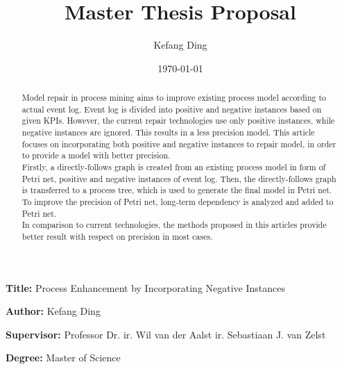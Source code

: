 \documentclass[]{article}
\title{Master Thesis Proposal}
\author{Kefang Ding}
\date{\today}
\newcommand{\namelistlabel}[1]{\mbox{#1}\hfil}
\newenvironment{namelist}[1]{%
	\begin{list}{}
		{
			\let\makelabel\namelistlabel
			\settowidth{\labelwidth}{#1}
			\setlength{\leftmargin}{1.1\labelwidth}
		}
	}{%
\end{list}}
\begin{document}
	\maketitle
	\hrulefill
	\begin{namelist}{xxxxxxxxxxxx}
		\item[{\bf Title:}]
		Process Enhancement by Incorporating Negative Instances
		\item[{\bf Author:}]
		Kefang Ding
		\item[{\bf Supervisor:}]
		Professor Dr. ir. Wil van der Aalst
		\newline
		ir. Sebastiaan J. van Zelst
		
		\item[{\bf Degree:}]
		Master of Science
	\end{namelist}
	\hrulefill 
\pagebreak
\begin{abstract}
Model repair in process mining aims to improve existing process model according to actual event log. Event log is divided into positive and negative instances based on given KPIs. However, the current repair technologies use only positive instances, while negative instances are ignored. This results in a  less precision model. This article focuses on incorporating both positive and negative instances to repair model, in order to provide a model with better precision. 
\\
Firstly, a directly-follows graph is created from an existing process model in form of Petri net,  positive and negative instances of event log. Then, the directly-follows graph is transferred to a process tree, which is used to generate the final model in Petri net. To improve the precision of Petri net, long-term dependency is analyzed and added to Petri net. 
\\ 
In comparison to current technologies, the methods proposed in this articles provide better result with respect on precision in most cases. 
\end{abstract}
\pagebreak
\end{document}
